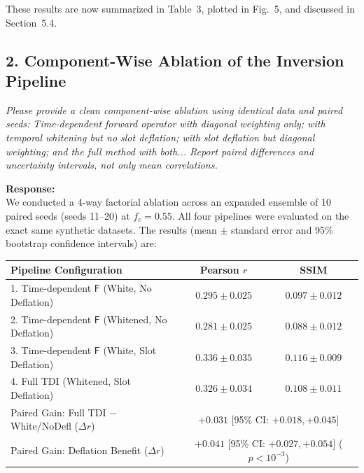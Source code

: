 \documentclass[11pt]{article}
\begin{document}
These results are now summarized in Table~3, plotted in Fig.~5, and discussed in Section~5.4.

\subsection*{2. Component-Wise Ablation of the Inversion Pipeline}

\begin{refcomment}
\textit{Please provide a clean component-wise ablation using identical data and paired seeds: Time-dependent forward operator with diagonal weighting only; with temporal whitening but no slot deflation; with slot deflation but diagonal weighting; and the full method with both... Report paired differences and uncertainty intervals, not only mean correlations.}
\end{refcomment}

\textbf{Response:}\\[1mm]
We conducted a 4-way factorial ablation across an expanded ensemble of 10 paired seeds (seeds 11--20) at $f_c=0.55$. All four pipelines were evaluated on the exact same synthetic datasets. The results (mean $\pm$ standard error and 95\% bootstrap confidence intervals) are:

\begin{center}
\small
\begin{tabular}{lcc}
\toprule
Pipeline Configuration & Pearson $r$ & SSIM \\
\midrule
1. Time-dependent $\mathsf{F}$ (White, No Deflation) & $0.295 \pm 0.025$ & $0.097 \pm 0.012$ \\
2. Time-dependent $\mathsf{F}$ (Whitened, No Deflation) & $0.281 \pm 0.025$ & $0.088 \pm 0.012$ \\
3. Time-dependent $\mathsf{F}$ (White, Slot Deflation)  & $0.336 \pm 0.035$ & $0.116 \pm 0.009$ \\
4. Full TDI (Whitened, Slot Deflation)                 & $0.326 \pm 0.034$ & $0.108 \pm 0.011$ \\
\midrule
Paired Gain: Full TDI $-$ White/NoDefl ($\Delta r$)   & \multicolumn{2}{c}{$+0.031$ [95\% CI: $+0.018, +0.045$]} \\
Paired Gain: Deflation Benefit ($\Delta r$)           & \multicolumn{2}{c}{$+0.041$ [95\% CI: $+0.027, +0.054$] ($p < 10^{-3}$)} \\
\bottomrule
\end{tabular}
\end{center}
\end{document}
